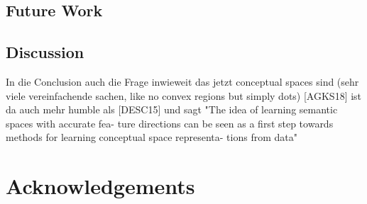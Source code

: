 \documentclass[11pt,
  paper=a4, 
  hidelinks,
  bibliography=totocnumbered,
	captions=tableheading,
	BCOR=10mm
]{scrreprt}
\theoremstyle{definition}
\begin{document}
\section{Future Work}




\section{Discussion}


In die Conclusion auch die Frage inwieweit das jetzt conceptual spaces sind (sehr viele vereinfachende sachen, like no convex regions but simply dots)
[AGKS18] ist da auch mehr humble als [DESC15] und sagt "The idea of learning semantic spaces with accurate fea- ture directions can be seen as a first step towards methods for learning conceptual space representa- tions from data"


\chapter*{Acknowledgements}



\glsaddall
\printglossaries %

	
	\appendix %
	
	
	
	

	
	
\printbibliography[heading=bibintoc]
\end{document}
